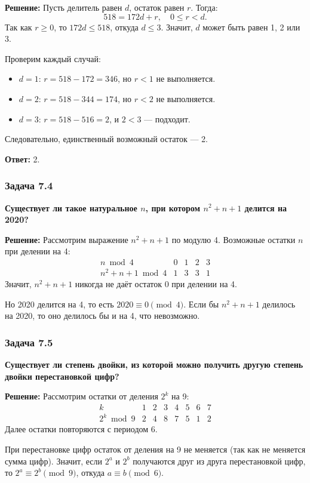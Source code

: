 \documentclass[12pt, a4paper]{article}
\begin{document}
\textbf{Решение:}
Пусть делитель равен $d$, остаток равен $r$. Тогда:
\[
518 = 172d + r, \quad 0 \le r < d.
\]
Так как $r \ge 0$, то $172d \le 518$, откуда $d \le 3$. Значит, $d$ может быть равен 1, 2 или 3.

Проверим каждый случай:
\begin{itemize}
    \item $d = 1$: $r = 518 - 172 = 346$, но $r < 1$ не выполняется.
    \item $d = 2$: $r = 518 - 344 = 174$, но $r < 2$ не выполняется.
    \item $d = 3$: $r = 518 - 516 = 2$, и $2 < 3$ — подходит.
\end{itemize}
Следовательно, единственный возможный остаток — 2.

\textbf{Ответ:} 2.

\subsubsection*{Задача 7.4}
\textbf{Существует ли такое натуральное $n$, при котором $n^2 + n + 1$ делится на 2020?}

\textbf{Решение:}
Рассмотрим выражение $n^2 + n + 1$ по модулю 4. Возможные остатки $n$ при делении на 4:
\[
\begin{array}{c|cccc}
n \bmod 4 & 0 & 1 & 2 & 3 \\
\hline
n^2 + n + 1 \bmod 4 & 1 & 3 & 3 & 1
\end{array}
\]
Значит, $n^2 + n + 1$ никогда не даёт остаток 0 при делении на 4.

Но 2020 делится на 4, то есть $2020 \equiv 0 \pmod{4}$. Если бы $n^2 + n + 1$ делилось на 2020, то оно делилось бы и на 4, что невозможно.

\subsubsection*{Задача 7.5}
\textbf{Существует ли степень двойки, из которой можно получить другую степень двойки перестановкой цифр?}

\textbf{Решение:}
Рассмотрим остатки от деления $2^k$ на 9:
\[
\begin{array}{c|ccccccc}
k & 1 & 2 & 3 & 4 & 5 & 6 & 7 \\
\hline
2^k \bmod 9 & 2 & 4 & 8 & 7 & 5 & 1 & 2
\end{array}
\]
Далее остатки повторяются с периодом 6.

При перестановке цифр остаток от деления на 9 не меняется (так как не меняется сумма цифр). Значит, если $2^a$ и $2^b$ получаются друг из друга перестановкой цифр, то $2^a \equiv 2^b \pmod{9}$, откуда $a \equiv b \pmod{6}$.
\end{document}
